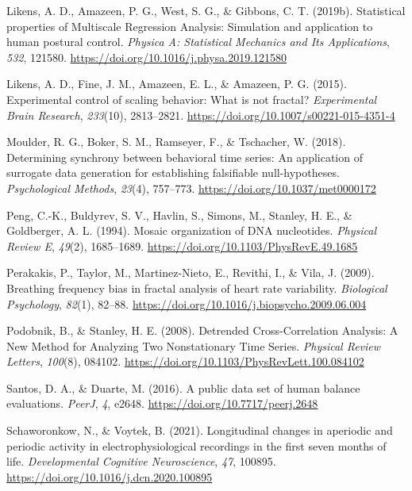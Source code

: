 \documentclass[
  man]{apa6}
\newlength{\cslhangindent}
\newlength{\cslentryspacingunit} %
\newenvironment{CSLReferences}[2] %
 {%
  \setlength{\parindent}{0pt}
  \ifodd #1
  \let\oldpar\par
  \def\par{\hangindent=\cslhangindent\oldpar}
  \fi
  \setlength{\parskip}{#2\cslentryspacingunit}
 }%
 {}
\begin{document}
\begin{CSLReferences}{1}{0}
\leavevmode{}%
Likens, A. D., Amazeen, P. G., West, S. G., \& Gibbons, C. T. (2019b). Statistical properties of Multiscale Regression Analysis: Simulation and application to human postural control. \emph{Physica A: Statistical Mechanics and Its Applications}, \emph{532}, 121580. \url{https://doi.org/10.1016/j.physa.2019.121580}

\leavevmode{}%
Likens, A. D., Fine, J. M., Amazeen, E. L., \& Amazeen, P. G. (2015). Experimental control of scaling behavior: What is not fractal? \emph{Experimental Brain Research}, \emph{233}(10), 2813--2821. \url{https://doi.org/10.1007/s00221-015-4351-4}

\leavevmode{}%
Moulder, R. G., Boker, S. M., Ramseyer, F., \& Tschacher, W. (2018). Determining synchrony between behavioral time series: An application of surrogate data generation for establishing falsifiable null-hypotheses. \emph{Psychological Methods}, \emph{23}(4), 757--773. \url{https://doi.org/10.1037/met0000172}

\leavevmode{}%
Peng, C.-K., Buldyrev, S. V., Havlin, S., Simons, M., Stanley, H. E., \& Goldberger, A. L. (1994). Mosaic organization of {DNA} nucleotides. \emph{Physical Review E}, \emph{49}(2), 1685--1689. \url{https://doi.org/10.1103/PhysRevE.49.1685}

\leavevmode{}%
Perakakis, P., Taylor, M., Martinez-Nieto, E., Revithi, I., \& Vila, J. (2009). Breathing frequency bias in fractal analysis of heart rate variability. \emph{Biological Psychology}, \emph{82}(1), 82--88. \url{https://doi.org/10.1016/j.biopsycho.2009.06.004}

\leavevmode{}%
Podobnik, B., \& Stanley, H. E. (2008). Detrended {Cross}-{Correlation} {Analysis}: {A} {New} {Method} for {Analyzing} {Two} {Nonstationary} {Time} {Series}. \emph{Physical Review Letters}, \emph{100}(8), 084102. \url{https://doi.org/10.1103/PhysRevLett.100.084102}

\leavevmode{}%
Santos, D. A., \& Duarte, M. (2016). A public data set of human balance evaluations. \emph{PeerJ}, \emph{4}, e2648. \url{https://doi.org/10.7717/peerj.2648}

\leavevmode{}%
Schaworonkow, N., \& Voytek, B. (2021). Longitudinal changes in aperiodic and periodic activity in electrophysiological recordings in the first seven months of life. \emph{Developmental Cognitive Neuroscience}, \emph{47}, 100895. \url{https://doi.org/10.1016/j.dcn.2020.100895}


\end{CSLReferences}
\end{document}
